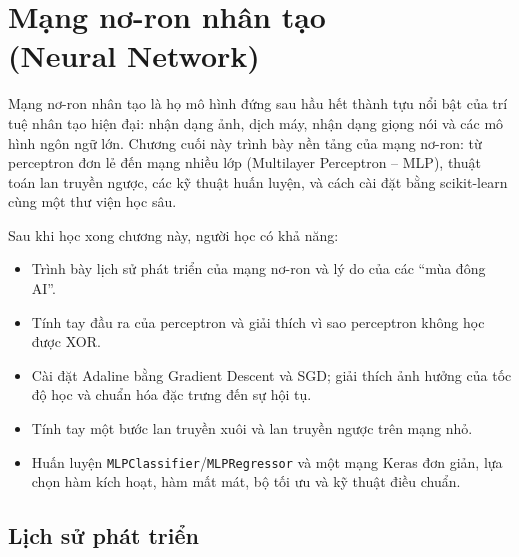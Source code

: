 
\chapter{Mạng nơ-ron nhân tạo \\ (Neural Network)}
\label{chap:neural-network}

Mạng nơ-ron nhân tạo là họ mô hình đứng sau hầu hết thành tựu nổi bật của trí tuệ nhân tạo hiện đại: nhận dạng ảnh, dịch máy, nhận dạng giọng nói và các mô hình ngôn ngữ lớn. Chương cuối này trình bày nền tảng của mạng nơ-ron: từ perceptron đơn lẻ đến mạng nhiều lớp (Multilayer Perceptron -- MLP), thuật toán lan truyền ngược, các kỹ thuật huấn luyện, và cách cài đặt bằng scikit-learn cùng một thư viện học sâu.

\noindent Sau khi học xong chương này, người học có khả năng:
\begin{itemize}
    \item Trình bày lịch sử phát triển của mạng nơ-ron và lý do của các ``mùa đông AI''.
    \item Tính tay đầu ra của perceptron và giải thích vì sao perceptron không học được XOR.
    \item Cài đặt Adaline bằng Gradient Descent và SGD; giải thích ảnh hưởng của tốc độ học và chuẩn hóa đặc trưng đến sự hội tụ.
    \item Tính tay một bước lan truyền xuôi và lan truyền ngược trên mạng nhỏ.
    \item Huấn luyện \texttt{MLPClassifier}/\texttt{MLPRegressor} và một mạng Keras đơn giản, lựa chọn hàm kích hoạt, hàm mất mát, bộ tối ưu và kỹ thuật điều chuẩn.
\end{itemize}

\section{Lịch sử phát triển}

